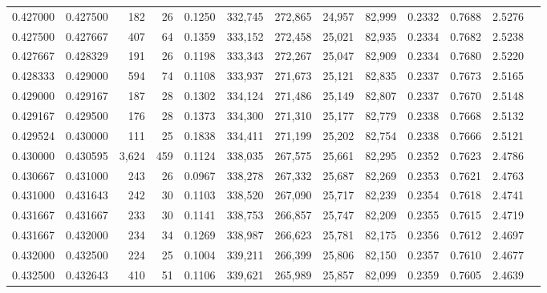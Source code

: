 \begin{tabular}{rrrrrrrrrrrrr}
0.427000 & 0.427500 &   182 &  26 &                                     0.1250 & 332,745 & 272,865 &  24,957 &  82,999 & 0.2332 & 0.7688 & 2.5276 \\
0.427500 & 0.427667 &   407 &  64 &                                     0.1359 & 333,152 & 272,458 &  25,021 &  82,935 & 0.2334 & 0.7682 & 2.5238 \\
0.427667 & 0.428329 &   191 &  26 &                                     0.1198 & 333,343 & 272,267 &  25,047 &  82,909 & 0.2334 & 0.7680 & 2.5220 \\
0.428333 & 0.429000 &   594 &  74 &                                     0.1108 & 333,937 & 271,673 &  25,121 &  82,835 & 0.2337 & 0.7673 & 2.5165 \\
0.429000 & 0.429167 &   187 &  28 &                                     0.1302 & 334,124 & 271,486 &  25,149 &  82,807 & 0.2337 & 0.7670 & 2.5148 \\
0.429167 & 0.429500 &   176 &  28 &                                     0.1373 & 334,300 & 271,310 &  25,177 &  82,779 & 0.2338 & 0.7668 & 2.5132 \\
0.429524 & 0.430000 &   111 &  25 &                                     0.1838 & 334,411 & 271,199 &  25,202 &  82,754 & 0.2338 & 0.7666 & 2.5121 \\
0.430000 & 0.430595 & 3,624 & 459 &                                     0.1124 & 338,035 & 267,575 &  25,661 &  82,295 & 0.2352 & 0.7623 & 2.4786 \\
0.430667 & 0.431000 &   243 &  26 &                                     0.0967 & 338,278 & 267,332 &  25,687 &  82,269 & 0.2353 & 0.7621 & 2.4763 \\
0.431000 & 0.431643 &   242 &  30 &                                     0.1103 & 338,520 & 267,090 &  25,717 &  82,239 & 0.2354 & 0.7618 & 2.4741 \\
0.431667 & 0.431667 &   233 &  30 &                                     0.1141 & 338,753 & 266,857 &  25,747 &  82,209 & 0.2355 & 0.7615 & 2.4719 \\
0.431667 & 0.432000 &   234 &  34 &                                     0.1269 & 338,987 & 266,623 &  25,781 &  82,175 & 0.2356 & 0.7612 & 2.4697 \\
0.432000 & 0.432500 &   224 &  25 &                                     0.1004 & 339,211 & 266,399 &  25,806 &  82,150 & 0.2357 & 0.7610 & 2.4677 \\
0.432500 & 0.432643 &   410 &  51 &                                     0.1106 & 339,621 & 265,989 &  25,857 &  82,099 & 0.2359 & 0.7605 & 2.4639 \\

\end{tabular}
